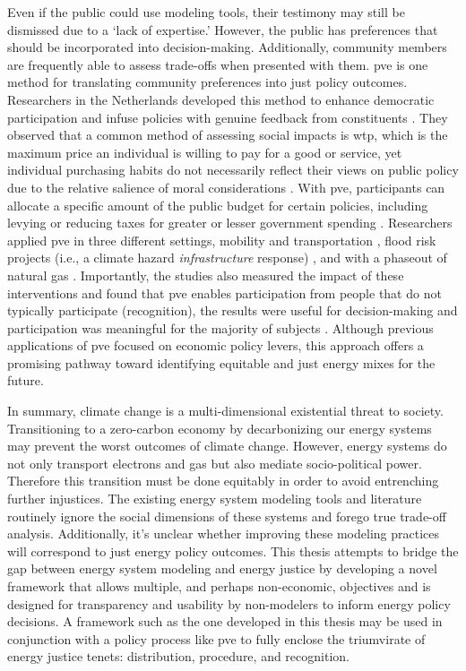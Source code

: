 Even if the public could use modeling tools, their testimony may still be dismissed due
to a `lack of expertise.' However, the public has preferences that should be incorporated 
into decision-making. Additionally, community members are frequently able to assess trade-offs when presented with them. 
\Acf{pve} is one method for translating community preferences into just policy outcomes.
Researchers in the Netherlands developed this method to enhance democratic participation
and infuse policies with genuine feedback from constituents \cite{mouter_introduction_2019}. They observed that a common method of assessing social
impacts is \ac{wtp}, which is the maximum price an individual is willing to pay for a good or service, yet individual purchasing habits do not necessarily reflect their views
on public policy due to the relative salience of moral considerations \cite{mouter_introduction_2019}. With \ac{pve}, participants can allocate 
a specific amount of the public budget for certain policies, including levying or 
reducing taxes for greater or lesser government spending \cite{mouter_introduction_2019}.
Researchers applied \ac{pve} in three different settings, mobility and transportation \cite{mouter_contrasting_2021}, flood risk projects (i.e., a climate hazard 
\textit{infrastructure} response) \cite{dekker_economics_2019}, and with a phaseout of
natural gas \cite{mouter_including_2021}. Importantly, the studies also measured
the impact of these interventions and found that \ac{pve} enables participation from
people that do not typically participate (recognition), the results were useful for
decision-making and participation was meaningful for the majority of subjects \cite{mouter_including_2021}. Although previous applications of \ac{pve} focused on 
economic policy levers, this approach offers a promising pathway toward identifying
equitable and just energy mixes for the future.

In summary, climate change is a multi-dimensional existential threat to society. Transitioning to a zero-carbon economy by decarbonizing our energy systems may prevent 
the worst outcomes of climate change. However, energy systems do not only transport 
electrons and gas but also mediate socio-political power. Therefore this transition must be done equitably in order to avoid entrenching further injustices. The existing energy system modeling tools and literature routinely ignore the social dimensions of these systems and forego true trade-off analysis. Additionally, it's unclear whether improving
these modeling practices will correspond to just energy policy outcomes. This thesis
attempts to bridge the gap between energy system modeling and energy justice by developing
a novel framework that allows multiple, and perhaps non-economic, objectives and is 
designed for transparency and usability by non-modelers to inform energy policy decisions.
A framework such as the one developed in this thesis may be used in conjunction with
a policy process like \ac{pve} to fully enclose the triumvirate of energy justice tenets: distribution, procedure, and recognition.
